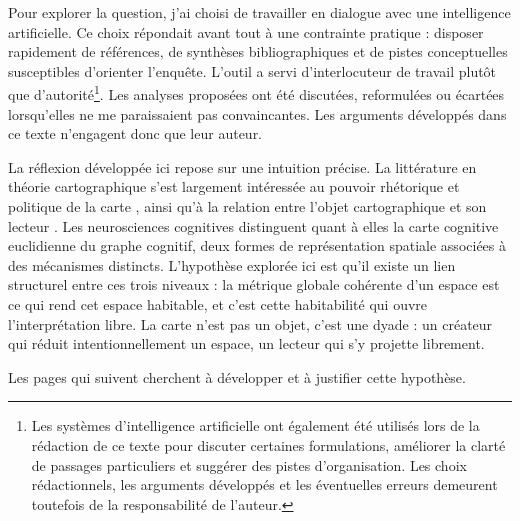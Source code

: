 Pour explorer la question, j'ai choisi de travailler en dialogue avec une intelligence artificielle. Ce choix répondait avant tout à une contrainte pratique : disposer rapidement de références, de synthèses bibliographiques et de pistes conceptuelles susceptibles d'orienter l'enquête. L'outil a servi d'interlocuteur de travail plutôt que d'autorité\footnote{Les systèmes d'intelligence artificielle ont également été utilisés lors de la rédaction de ce texte pour discuter certaines formulations, améliorer la clarté de passages particuliers et suggérer des pistes d'organisation. Les choix rédactionnels, les arguments développés et les éventuelles erreurs demeurent toutefois de la responsabilité de l'auteur.}. Les analyses proposées ont été discutées, reformulées ou écartées lorsqu'elles ne me paraissaient pas convaincantes. Les arguments développés dans ce texte n'engagent donc que leur auteur.

La réflexion développée ici repose sur une intuition précise. La littérature en théorie cartographique s'est largement intéressée au pouvoir rhétorique et politique de la carte \parencite{harley2001, wood1992}, ainsi qu'à la relation entre l'objet cartographique et son lecteur \parencite{denil2021}. Les neurosciences cognitives distinguent quant à elles la carte cognitive euclidienne du graphe cognitif, deux formes de représentation spatiale associées à des mécanismes distincts. L'hypothèse explorée ici est qu'il existe un lien structurel entre ces trois niveaux : la métrique globale cohérente d'un espace est ce qui rend cet espace habitable, et c'est cette habitabilité qui ouvre l'interprétation libre. La carte n'est pas un objet, c'est une dyade : un créateur qui réduit intentionnellement un espace, un lecteur qui s'y projette librement.

Les pages qui suivent cherchent à développer et à justifier cette hypothèse.